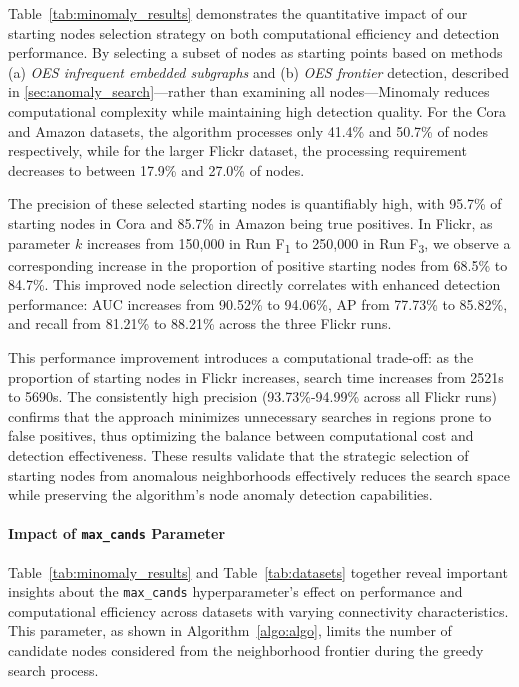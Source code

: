 \documentclass[pdflatex,sn-mathphys-num]{sn-jnl}%
\theoremstyle{thmstyleone}%
\theoremstyle{thmstyletwo}%
\theoremstyle{thmstylethree}%
\begin{document}
Table~\ref{tab:minomaly_results} demonstrates the quantitative impact of our starting nodes selection strategy on both computational efficiency and detection performance. By selecting a subset of nodes as starting points based on methods (a) \textit{OES infrequent embedded subgraphs} and (b) \textit{OES frontier} detection, described in \ref{sec:anomaly_search}—rather than examining all nodes—Minomaly reduces computational complexity while maintaining high detection quality. For the Cora and Amazon datasets, the algorithm processes only 41.4\% and 50.7\% of nodes respectively, while for the larger Flickr dataset, the processing requirement decreases to between 17.9\% and 27.0\% of nodes.

The precision of these selected starting nodes is quantifiably high, with 95.7\% of starting nodes in Cora and 85.7\% in Amazon being true positives. In Flickr, as parameter $k$ increases from 150,000 in Run F\textsubscript{1} to 250,000 in Run F\textsubscript{3}, we observe a corresponding increase in the proportion of positive starting nodes from 68.5\% to 84.7\%. This improved node selection directly correlates with enhanced detection performance: AUC increases from 90.52\% to 94.06\%, AP from 77.73\% to 85.82\%, and recall from 81.21\% to 88.21\% across the three Flickr runs.

This performance improvement introduces a computational trade-off: as the proportion of starting nodes in Flickr increases, search time increases from 2521s to 5690s. The consistently high precision (93.73\%-94.99\% across all Flickr runs) confirms that the approach minimizes unnecessary searches in regions prone to false positives, thus optimizing the balance between computational cost and detection effectiveness. These results validate that the strategic selection of starting nodes from anomalous neighborhoods effectively reduces the search space while preserving the algorithm's node anomaly detection capabilities.

\paragraph{Impact of \texttt{max\_cands} Parameter}

Table~\ref{tab:minomaly_results} and Table~\ref{tab:datasets} together reveal important insights about the \texttt{max\_cands} hyperparameter's effect on performance and computational efficiency across datasets with varying connectivity characteristics. This parameter, as shown in Algorithm~\ref{algo:algo}, limits the number of candidate nodes considered from the neighborhood frontier during the greedy search process.
\end{document}
